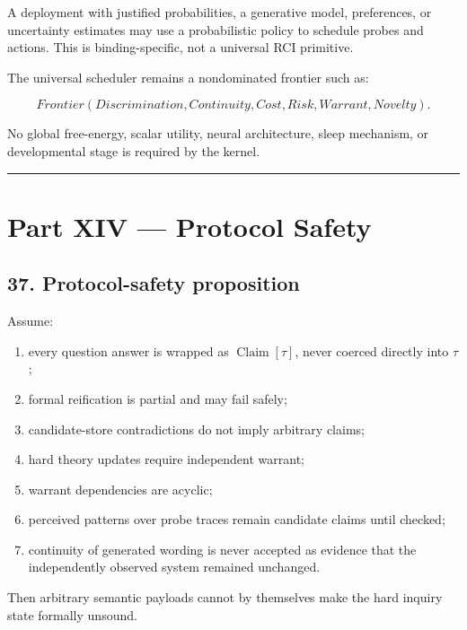 \documentclass[
]{article}
\providecommand{\tightlist}{%
  \setlength{\itemsep}{0pt}\setlength{\parskip}{0pt}}
\begin{document}
A deployment with justified probabilities, a generative model, preferences, or
uncertainty estimates may use a probabilistic policy to schedule probes and
actions. This is binding-specific, not a universal RCI primitive.

The universal scheduler remains a nondominated frontier such as:

\[
\boxed{
Frontier(
Discrimination,
Continuity,
Cost,
Risk,
Warrant,
Novelty
).
}
\]

No global free-energy, scalar utility, neural architecture, sleep mechanism, or
developmental stage is required by the kernel.

\begin{center}\rule{0.5\linewidth}{0.5pt}\end{center}

\section{Part XIV --- Protocol Safety}\label{part-xiv-protocol-safety}

\subsection{37. Protocol-safety
proposition}\label{protocol-safety-proposition}

Assume:

\begin{enumerate}
\def\labelenumi{\arabic{enumi}.}
\tightlist
\item
  every question answer is wrapped as \(\operatorname{Claim}[\tau]\),
  never coerced directly into \(\tau\);
\item
  formal reification is partial and may fail safely;
\item
  candidate-store contradictions do not imply arbitrary claims;
\item
  hard theory updates require independent warrant;
\item
  warrant dependencies are acyclic;
\item
  perceived patterns over probe traces remain candidate claims until checked;
\item
  continuity of generated wording is never accepted as evidence that the
  independently observed system remained unchanged.
\end{enumerate}

Then arbitrary semantic payloads cannot by themselves make the hard
inquiry state formally unsound.
\end{document}
